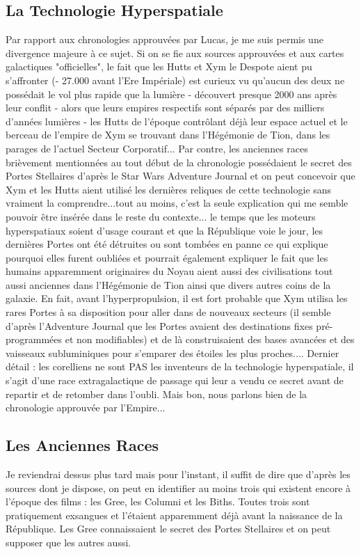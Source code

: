 \documentclass[twoside]{article}
\begin{document}
\subsection{La Technologie Hyperspatiale}
Par rapport aux chronologies approuvées par Lucas, je me suis permis une divergence majeure à ce sujet.
Si on se fie aux sources approuvées et aux cartes galactiques "officielles", le fait que les Hutts et Xym le Despote aient pu s'affronter (- 27.000 avant l'Ere Impériale) est curieux vu qu'aucun des deux ne possédait le vol plus rapide que la lumière - découvert presque 2000 ans après leur conflit - alors que leurs empires respectifs sont séparés par des milliers d'années lumières - les Hutts de l'époque contrôlant déjà leur espace actuel et le berceau de l'empire de Xym se trouvant dans l'Hégémonie de Tion, dans les parages de l'actuel Secteur Corporatif... 
Par contre, les anciennes races brièvement mentionnées au tout début de la chronologie possédaient le secret des Portes Stellaires d'après le Star Wars Adventure Journal et on peut concevoir que Xym et les Hutts aient utilisé les dernières reliques de cette technologie sans vraiment la comprendre...tout au moins, c'est la seule explication qui me semble pouvoir être insérée dans le reste du contexte... le temps que les moteurs hyperspatiaux soient d'usage courant et que la République voie le jour, les dernières Portes ont été détruites ou sont tombées en panne ce qui explique pourquoi elles furent oubliées et pourrait également expliquer le fait que les humains apparemment originaires du Noyau aient aussi  des civilisations tout aussi anciennes dans l'Hégémonie de Tion ainsi que divers autres coins de la galaxie. En fait, avant l'hyperpropulsion, il est fort probable que Xym utilisa  les rares Portes à sa disposition pour aller dans de nouveaux secteurs (il semble d'après l'Adventure Journal que les Portes avaient des destinations fixes pré-programmées et non modifiables) et de là construisaient des bases avancées et des vaisseaux subluminiques pour s'emparer des étoiles les plus proches....
Dernier détail : les corelliens ne sont PAS les inventeurs de la technologie hyperspatiale, il s'agit d'une race extragalactique de passage qui leur a vendu ce secret avant de repartir et de retomber dans l'oubli. Mais bon, nous parlons bien de la chronologie approuvée par l'Empire...

\subsection{Les Anciennes Races }
Je reviendrai dessus plus tard mais pour l'instant, il suffit de dire que d'après les sources dont je dispose, on peut en identifier au moins trois qui existent encore à l'époque des films : les Gree, les Columni et les Biths. Toutes trois sont pratiquement exsangues et l'étaient apparemment déjà  avant la naissance de la République. Les Gree connaissaient le secret des Portes Stellaires et on peut supposer que les autres aussi. \\
\end{document}
